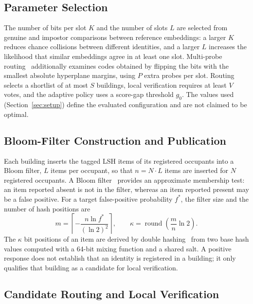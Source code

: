 \documentclass[pdflatex,sn-mathphys-num]{sn-jnl}%
\theoremstyle{thmstyleone}%
\theoremstyle{thmstyletwo}%
\theoremstyle{thmstylethree}%
\begin{document}
\subsection{Parameter Selection}
\label{subsec:parameter_selection}

The number of bits per slot $K$ and the number of slots $L$ are selected from genuine and impostor comparisons between reference embeddings: a larger $K$ reduces chance collisions between different identities, and a larger $L$ increases the likelihood that similar embeddings agree in at least one slot. Multi-probe routing~\cite{lv2007} additionally examines codes obtained by flipping the bits with the smallest absolute hyperplane margins, using $P$ extra probes per slot. Routing selects a shortlist of at most $S$ buildings, local verification requires at least $V$ votes, and the adaptive policy uses a score-gap threshold $g_0$. The values used (Section~\ref{sec:setup}) define the evaluated configuration and are not claimed to be optimal.

\subsection{Bloom-Filter Construction and Publication}
\label{subsec:bloom_filter}

Each building inserts the tagged LSH items of its registered occupants into a Bloom filter, $L$ items per occupant, so that $n=N\cdot L$ items are inserted for $N$ registered occupants. A Bloom filter~\cite{bloom1970} provides an approximate membership test: an item reported absent is not in the filter, whereas an item reported present may be a false positive. For a target false-positive probability $f^*$, the filter size and the number of hash positions are
\begin{equation}
    m =
    \left\lceil
    -\frac{n\ln f^*}{(\ln 2)^2}
    \right\rceil,
    \qquad
    \kappa =
    \operatorname{round}
    \left(\frac{m}{n}\ln 2\right).
    \label{eq:bloom_size}
\end{equation}
The $\kappa$ bit positions of an item are derived by double hashing~\cite{kirsch2006} from two base hash values computed with a 64-bit mixing function and a shared salt. A positive response does not establish that an identity is registered in a building; it only qualifies that building as a candidate for local verification.

\subsection{Candidate Routing and Local Verification}
\label{subsec:routing_verification}
\end{document}
